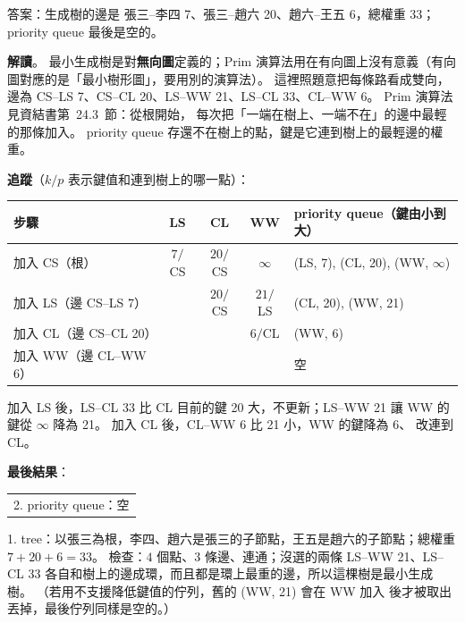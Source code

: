 \begin{pastsoln}
答案：生成樹的邊是 張三–李四 7、張三–趙六 20、趙六–王五 6，總權重 $33$；priority queue 最後是空的。

\textbf{解讀}。 最小生成樹是對\textbf{無向圖}定義的；Prim 演算法用在有向圖上沒有意義（有向圖對應的是「最小樹形圖」，要用別的演算法）。
這裡照題意把每條路看成雙向，邊為 CS–LS 7、CS–CL 20、LS–WW 21、LS–CL 33、CL–WW 6。 Prim 演算法見資結書第~24.3~節：從根開始，
每次把「一端在樹上、一端不在」的邊中最輕的那條加入。 priority queue 存還不在樹上的點，鍵是它連到樹上的最輕邊的權重。

\textbf{追蹤}（$k/p$ 表示鍵值和連到樹上的哪一點）：
\begin{center}
\small
\begin{tabular}{lcccl}
\toprule
步驟 & LS & CL & WW & priority queue（鍵由小到大） \\
\midrule
加入 CS（根） & $7/$CS & $20/$CS & $\infty$ & (LS, 7), (CL, 20), (WW, $\infty$) \\
加入 LS（邊 CS–LS 7） & & $20/$CS & $21/$LS & (CL, 20), (WW, 21) \\
加入 CL（邊 CS–CL 20） & & & $6/$CL & (WW, 6) \\
加入 WW（邊 CL–WW 6） & & & & 空 \\
\bottomrule
\end{tabular}
\end{center}
加入 LS 後，LS–CL 33 比 CL 目前的鍵 20 大，不更新；LS–WW 21 讓 WW 的鍵從 $\infty$ 降為 21。 加入 CL 後，CL–WW 6 比 21 小，WW 的鍵降為 6、
改連到 CL。

\textbf{最後結果}：
\begin{center}
\qquad\qquad
\begin{tabular}[b]{l}
2. priority queue：空 \\[1em]
\end{tabular}
\end{center}
1. tree：以張三為根，李四、趙六是張三的子節點，王五是趙六的子節點；總權重 $7 + 20 + 6 = 33$。 檢查：$4$ 個點、$3$ 條邊、連通；沒選的兩條
LS–WW 21、LS–CL 33 各自和樹上的邊成環，而且都是環上最重的邊，所以這棵樹是最小生成樹。 （若用不支援降低鍵值的佇列，舊的 (WW, 21) 會在 WW 加入
後才被取出丟掉，最後佇列同樣是空的。）
\end{pastsoln}
